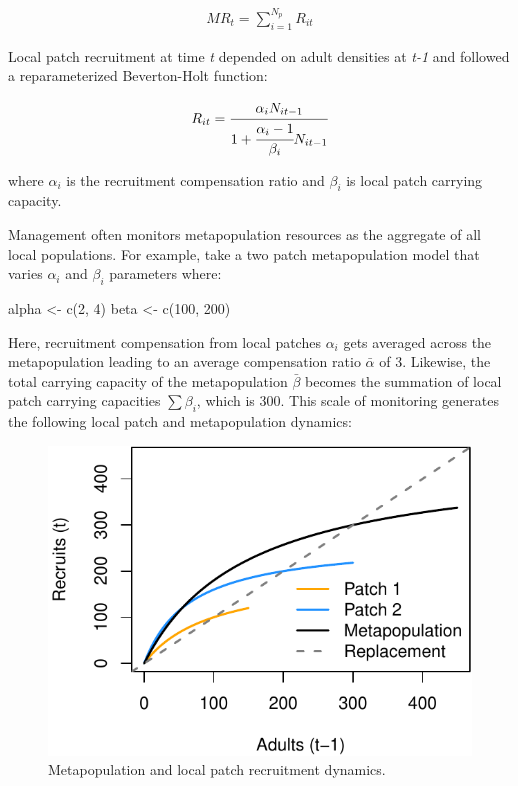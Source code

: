 \documentclass[
]{article}
\newenvironment{Shaded}{\begin{snugshade}}{\end{snugshade}}
\newcommand{\DecValTok}[1]{\textcolor[rgb]{0.00,0.00,0.81}{#1}}
\newcommand{\FunctionTok}[1]{\textcolor[rgb]{0.00,0.00,0.00}{#1}}
\newcommand{\NormalTok}[1]{#1}
\newcommand{\OtherTok}[1]{\textcolor[rgb]{0.56,0.35,0.01}{#1}}
\begin{document}
\begin{align}
MR_t = \sum_{i=1}^{N_p} R_{it}
\end{align}

Local patch recruitment at time \emph{t} depended on adult densities at
\emph{t-1} and followed a reparameterized Beverton-Holt function:

\begin{align}
R_{it}=\cfrac{\alpha_iN_{it-1}}{1+\cfrac{\alpha_i-1}{\beta_i}N_{it-1}}
\end{align}

where \(\alpha_i\) is the recruitment compensation ratio and \(\beta_i\)
is local patch carrying capacity.

Management often monitors metapopulation resources as the aggregate of
all local populations. For example, take a two patch metapopulation
model that varies \(\alpha_i\) and \(\beta_i\) parameters where:

\begin{Shaded}
\begin{Highlighting}[]
\NormalTok{alpha }\OtherTok{\textless{}{-}} \FunctionTok{c}\NormalTok{(}\DecValTok{2}\NormalTok{, }\DecValTok{4}\NormalTok{)}
\NormalTok{beta }\OtherTok{\textless{}{-}} \FunctionTok{c}\NormalTok{(}\DecValTok{100}\NormalTok{, }\DecValTok{200}\NormalTok{)}
\end{Highlighting}
\end{Shaded}

Here, recruitment compensation from local patches \(\alpha_i\) gets
averaged across the metapopulation leading to an average compensation
ratio \(\bar{\alpha}\) of 3. Likewise, the total carrying capacity of
the metapopulation \(\bar{\beta}\) becomes the summation of local patch
carrying capacities \(\sum\beta_i\), which is 300. This scale of
monitoring generates the following local patch and metapopulation
dynamics:

\begin{figure}[H]

{\centering \includegraphics{Managing_for_ecological_surprises_in_metapopulations_files/figure-latex/recruit curves-1} 

}

\caption{Metapopulation and local patch recruitment dynamics.}\label{fig:recruit curves}
\end{figure}
\end{document}
